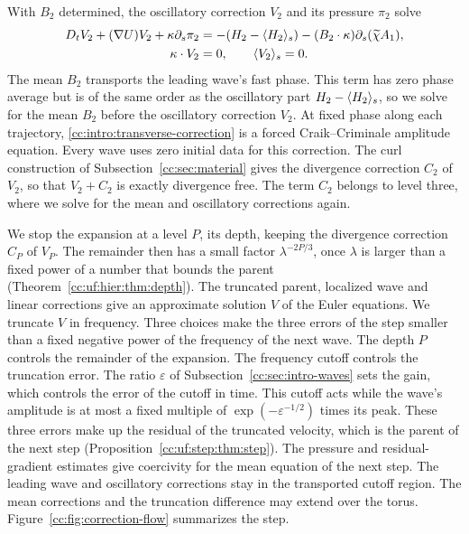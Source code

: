 With $B_2$ determined, the oscillatory correction $V_2$ and its pressure
$\pi_2$ solve
\begin{equation}\label{cc:intro:transverse-correction}
 \begin{split}
 D_tV_2+(\nabla U)V_2+\kappa\partial_s\pi_2
   &=-(H_2-\langle H_2\rangle_s)-(B_2\cdot\kappa)\partial_s(\widetilde\chi A_1),\\
 \kappa\cdot V_2&=0,\qquad \langle V_2\rangle_s=0.
 \end{split}
\end{equation}
The mean $B_2$ transports the leading wave's fast phase. This term has
zero phase average but is of the same order as the oscillatory part
$H_2-\langle H_2\rangle_s$, so we solve for the mean $B_2$ before the oscillatory
correction $V_2$. At fixed phase along each trajectory,
\eqref{cc:intro:transverse-correction} is a forced Craik--Criminale
amplitude equation. Every wave uses
zero initial data for this correction. The curl construction of
Subsection~\ref{cc:sec:material} gives the divergence correction $C_2$
of $V_2$, so that $V_2+C_2$ is exactly divergence free. The term $C_2$
belongs to level three, where we solve for the mean and oscillatory
corrections again.

We stop the expansion at a level $P$, its depth, keeping the divergence
correction $C_P$ of $V_P$. The remainder then has a small factor
$\lambda^{-2P/3}$, once $\lambda$ is larger
than a fixed power of a number that bounds the parent
(Theorem~\ref{cc:uf:hier:thm:depth}). The truncated parent, localized wave
and linear corrections give an approximate solution $V$ of the Euler
equations. We truncate $V$ in frequency. Three choices make the three
errors of the step smaller than a fixed negative power of the frequency
of the next wave. The depth $P$ controls the remainder of the
expansion. The frequency cutoff controls the truncation error. The
ratio $\varepsilon$ of Subsection~\ref{cc:sec:intro-waves} sets the
gain, which controls the error of the cutoff in time. This cutoff acts
while the wave's amplitude is at most a fixed multiple of
$\exp(-\varepsilon^{-1/2})$ times its peak. These three errors make up
the residual of the truncated velocity, which is the parent of the next step
(Proposition~\ref{cc:uf:step:thm:step}).
The pressure and residual-gradient estimates give coercivity for
the mean equation of the next step. The leading wave and oscillatory
corrections stay in the transported cutoff region. The mean corrections
and the truncation difference may extend over the torus. Figure~\ref{cc:fig:correction-flow} summarizes the step.

